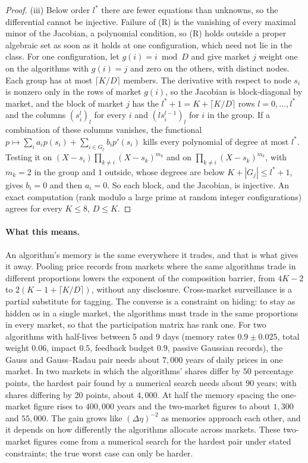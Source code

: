 \begin{proof}
(iii) Below order $l^*$ there are fewer equations than unknowns, so the differential cannot be injective. Failure of (R) is the vanishing of every maximal minor of the Jacobian, a polynomial condition, so (R) holds outside a proper algebraic set as soon as it holds at one configuration, which need not lie in the class. For one configuration, let $g(i)=i\bmod D$ and give market $j$ weight one on the algorithms with $g(i)=j$ and zero on the others, with distinct nodes. Each group has at most $\lceil K/D\rceil$ members. The derivative with respect to node $s_i$ is nonzero only in the rows of market $g(i)$, so the Jacobian is block-diagonal by market, and the block of market $j$ has the $l^*+1=K+\lceil K/D\rceil$ rows $l=0,\ldots,l^*$ and the columns $(s_i^l)_l$ for every $i$ and $(l s_i^{l-1})_l$ for $i$ in the group. If a combination of these columns vanishes, the functional $p\mapsto\sum_ia_ip(s_i)+\sum_{i\in G_j}b_ip'(s_i)$ kills every polynomial of degree at most $l^*$. Testing it on $(X-s_i)\prod_{k\ne i}(X-s_k)^{m_k}$ and on $\prod_{k\ne i}(X-s_k)^{m_k}$, with $m_k=2$ in the group and $1$ outside, whose degrees are below $K+|G_j|\le l^*+1$, gives $b_i=0$ and then $a_i=0$. So each block, and the Jacobian, is injective. An exact computation (rank modulo a large prime at random integer configurations) agrees for every $K\le8$, $D\le K$.
\end{proof}

\paragraph{What this means.} An algorithm's memory is the same everywhere it trades, and that is what gives it away. Pooling price records from markets where the same algorithms trade in different proportions lowers the exponent of the composition barrier, from $4K-2$ to $2(K-1+\lceil K/D\rceil)$, without any disclosure. Cross-market surveillance is a partial substitute for tagging. The converse is a constraint on hiding: to stay as hidden as in a single market, the algorithms must trade in the same proportions in every market, so that the participation matrix has rank one. For two algorithms with half-lives between 5 and 9 days (memory rates $0.9\pm0.025$, total weight $0.06$, impact $0.5$, feedback budget $0.9$, passive Gaussian records), the Gauss and Gauss--Radau pair needs about $7{,}000$ years of daily prices in one market. In two markets in which the algorithms' shares differ by $50$ percentage points, the hardest pair found by a numerical search needs about $90$ years; with shares differing by $20$ points, about $4{,}000$. At half the memory spacing the one-market figure rises to $400{,}000$ years and the two-market figures to about $1{,}300$ and $55{,}000$. The gain grows like $(\Delta\eta)^{-2}$ as memories approach each other, and it depends on how differently the algorithms allocate across markets. These two-market figures come from a numerical search for the hardest pair under stated constraints; the true worst case can only be harder.

